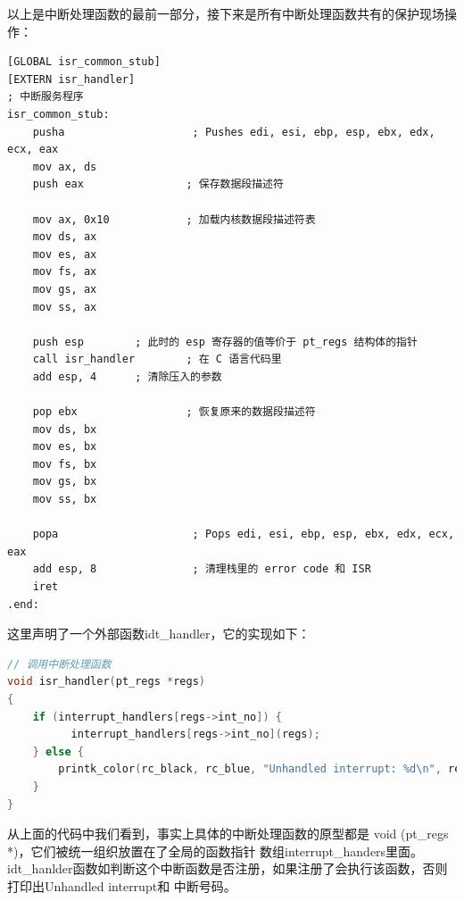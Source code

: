 \par 以上是中断处理函数的最前一部分，接下来是所有中断处理函数共有的保护现场操作：
\begin{lstlisting}[language = {[x86masm]Assembler}, caption = gdt/gdt\_s.s]
[GLOBAL isr_common_stub]
[EXTERN isr_handler]
; 中断服务程序
isr_common_stub:
	pusha                    ; Pushes edi, esi, ebp, esp, ebx, edx, ecx, eax
	mov ax, ds
	push eax                ; 保存数据段描述符
	
	mov ax, 0x10            ; 加载内核数据段描述符表
	mov ds, ax
	mov es, ax
	mov fs, ax
	mov gs, ax
	mov ss, ax
	
	push esp		; 此时的 esp 寄存器的值等价于 pt_regs 结构体的指针
	call isr_handler        ; 在 C 语言代码里
	add esp, 4 		; 清除压入的参数
	
	pop ebx                 ; 恢复原来的数据段描述符
	mov ds, bx
	mov es, bx
	mov fs, bx
	mov gs, bx
	mov ss, bx
	
	popa                     ; Pops edi, esi, ebp, esp, ebx, edx, ecx, eax
	add esp, 8               ; 清理栈里的 error code 和 ISR
	iret
.end:
\end{lstlisting}

\par 这里声明了一个外部函数idt\_handler，它的实现如下：
\begin{lstlisting}[language = C, caption = gdt/gdt.c]
// 调用中断处理函数
void isr_handler(pt_regs *regs)
{
	if (interrupt_handlers[regs->int_no]) {
	      interrupt_handlers[regs->int_no](regs);
	} else {
		printk_color(rc_black, rc_blue, "Unhandled interrupt: %d\n", regs->int_no);
	}
}
\end{lstlisting}

\par 从上面的代码中我们看到，事实上具体的中断处理函数的原型都是 void (pt\_regs *)，它们被统一组织放置在了全局的函数指针\allowbreak
数组interrupt\_handers里面。idt\_hanlder函数如判断这个中断函数是否注册，如果注册了会执行该函数，否则打印出Unhandled interrupt和\allowbreak
中断号码。

